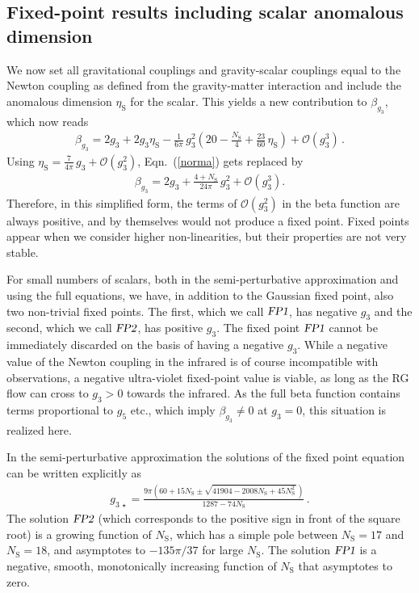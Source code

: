 \documentclass[11pt]{book}
\newcommand\etaS{ \eta_{\scriptscriptstyle{\mathrm{S}}} }
\newcommand\NS{ N_{\scriptscriptstyle{\mathrm{S}}} }
\newcommand{\FPone}  {\textsl{FP1}}
\newcommand{\FPtwo}  {\textsl{FP2}}
\numberwithin{equation}{chapter}
\begin{document}
\subsection{Fixed-point results including scalar anomalous dimension}
\label{FPwithmatterincludingetas}

We now set all gravitational couplings and gravity-scalar couplings equal to the Newton
coupling as defined from the gravity-matter interaction and include the anomalous dimension $\etaS$ for the scalar.
This yields a new contribution to $\beta_{g_3}$, which now reads
\begin{align}
  \beta_{g_3} = 2 g_3 + 2 g_3 \etaS - \frac{1}{6\pi} \, g_3^2
  \left( 20 - \frac{\NS}{4} + \frac{23}{60} \, \etaS \right)
  + \mathcal{O}(g_3^3) \,.
\end{align}
Using $\etaS = \frac{7}{4\pi} \, g_3 + \mathcal{O}(g_3^2)$, Eqn.~(\ref{norma}) gets replaced by
\begin{align}
  \beta_{g_3} = 2 g_3 +\frac{4+\NS}{24\pi} \, g_3^2 + \mathcal{O}(g_3^3).
\end{align}
Therefore, in this simplified form,
the terms of $\mathcal O(g_3^2)$ in the beta function
are always positive, and by themselves would
not produce a fixed point.
Fixed points appear when we consider higher non-linearities,
but their properties are not very stable.

For small numbers of scalars, both in the semi-perturbative
approximation and using the full equations, we have,
in addition to the Gaussian fixed point,
also two non-trivial fixed points.
The first, which we call $\FPone$, has
negative $g_3$ and the second, which we call $\FPtwo$,
has positive $g_3$.
The fixed point $\FPone$ cannot be immediately
discarded on the basis of having a negative $g_3$.
While a negative value of the Newton coupling in the infrared is of course incompatible with observations,
a negative ultra-violet fixed-point value is viable,
as long as the RG flow can cross to $g_3>0$ towards the infrared.
As the full beta function contains terms proportional to $g_5$ etc.,
which imply $\beta_{g_3}\neq0$ at $g_3=0$, this situation is realized here.

In the semi-perturbative approximation the solutions
of the fixed point equation can be written explicitly as
\begin{align}
  g_{3\,\star} = \frac{9 \pi \left( 60 + 15 \NS \pm \sqrt{41904-2008\NS+45\NS^2\,} \right)}{1287-74\NS} \,.
\end{align}
The solution $\FPtwo$ (which corresponds to the positive sign
in front of the square root) is a growing function of $\NS$, which has a simple pole
between $\NS=17$ and $\NS=18$, and asymptotes to $-135\pi/37$ for large $\NS$.
The solution $\FPone$ is a negative, smooth, monotonically increasing function
of $\NS$ that asymptotes to zero.
\end{document}
